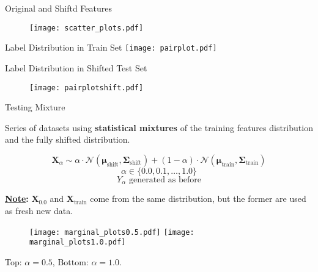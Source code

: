 \begin{frame}{Original and Shiftd Features}
    \begin{figure}
        \centering
        \texttt{[image: scatter\_plots.pdf]}
    \end{figure}
\end{frame}

\begin{frame}{Label Distribution in Train Set} 
    \vfill
    \centering
    \texttt{[image: pairplot.pdf]}
    \vfill

\end{frame}

\begin{frame}{Label Distribution in Shifted Test Set}
    \begin{figure}
        \centering
        \vfill
        \texttt{[image: pairplotshift.pdf]}
    \end{figure}
\end{frame}

\begin{frame}{Testing Mixture}
    
    Series of datasets using \textbf{statistical mixtures} of the training features distribution and the fully shifted distribution.

    $$
    \boldsymbol{X}_\alpha \sim \alpha\cdot\mathcal{N}(\boldsymbol{\mu}_{\text{shift}}, \boldsymbol{\Sigma}_{\text{shift}}) + (1-\alpha)\cdot\mathcal{N}(\boldsymbol{\mu}_{\text{train}}, \boldsymbol{\Sigma}_{\text{train}})
    $$
    $$
    \alpha \in \{0.0, 0.1, \dots, 1.0\}
    $$
    $$
    Y_\alpha \text{ generated as before}
    $$

    \textbf{\underline{Note}:} $\boldsymbol{X}_{0.0}$ and $\boldsymbol{X}_{\text{train}}$ come from the same distribution, but the former are used as fresh new data.

\end{frame}

\begin{frame}
    \vfill
    \begin{figure}
        \centering
        \texttt{[image: marginal\_plots0.5.pdf]}
        \texttt{[image: marginal\_plots1.0.pdf]}
    \end{figure}
    Top: $\alpha=0.5$, Bottom: $\alpha=1.0$.
\end{frame}

